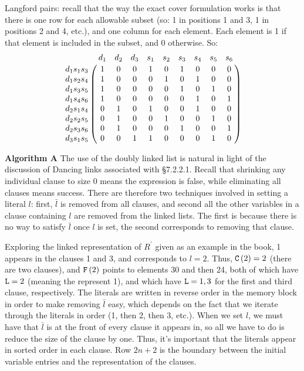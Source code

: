 
 Langford pairs: recall that the way the exact cover
formulation works is that there is one row for each allowable subset
(so: 1 in positions 1 and 3, 1 in positions 2 and 4, etc.), and one
column for each element.  Each element is 1 if that element
is included in the subset, and 0 otherwise.  So:
$$
 \bordermatrix{
  ~                   & d_1 & d_2 & d_3 & s_1 & s_2 & s_3 & s_4 & s_5 & s_6 \cr
   d_1 s_1 s_3 & 1    & 0     & 0     & 1     & 0     & 1     & 0     & 0     & 0    \cr
   d_1 s_2 s_4 & 1    & 0     & 0     & 0     & 1     & 0     & 1     & 0     & 0    \cr
   d_1 s_3 s_5 & 1    & 0     & 0     & 0     & 0     & 1     & 0     & 1     & 0    \cr
   d_1 s_4 s_6 & 1    & 0     & 0     & 0     & 0     & 0     & 1     & 0     & 1    \cr
   d_2 s_1 s_4 & 0    & 1     & 0     & 1     & 0     & 0     & 1     & 0     & 0    \cr
   d_2 s_2 s_5 & 0    & 1     & 0     & 0     & 1     & 0     & 0     & 1     & 0    \cr
   d_2 s_3 s_6 & 0    & 1     & 0     & 0     & 0     & 1     & 0     & 0     & 1    \cr
   d_3 s_1 s_5 & 0    & 0     & 1     & 1     & 0     & 0     & 0     & 1     & 0    \cr
 } 
$$


 {\bf Algorithm A}\hfil\break
The use of the doubly linked list is
natural in light of the discussion of Dancing links associated with 
\S 7.2.2.1.  Recall that shrinking any individual
clause to size 0 means the expression is false, while eliminating
all clauses means success.  There are therefore two techniques involved
in setting a literal $l$: first, $\bar l$ is removed from all clauses, and
second all the other variables in a clause containing $l$ are removed
from the linked lists.  The first is because there is no way to satisfy
$\bar l$ once $l$ is set, the second corresponds to removing that clause.

Exploring the linked representation of $R^{\prime}$ given as an example in the book,
1 appears in the clauses 1 and 3, and corresponds to $l = 2$.  Thus, 
${\tt C}\left(2\right) = 2$
(there are two clauses), and ${\tt F}\left(2\right)$ points to elements 30
and then 24, both of which have ${\tt L} = 2$ (meaning the represent
1), and which have ${\tt L} = 1, 3$ for the first and third clause, respectively.
The literals are written in reverse order in the memory block in order to
make removing $\bar l$ easy, which depends on the fact that we iterate
through the literals in order (1, then 2, then 3, etc.).  When we set $l$,
we must have that $\bar l$ is at the front of every clause it appears in, so
all we have to do is reduce the size of the clause by one.  Thus, it's
important that the literals appear in sorted order in each clause.  Row $2 n + 2$
is the boundary between the initial variable entries and the representation
of the clauses.

